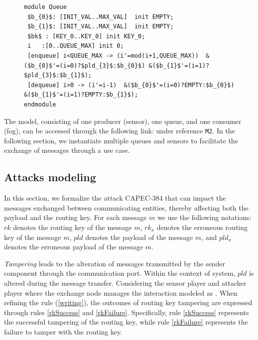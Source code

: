 \begin{figure}[!htb]            
\begin{minipage}{16cm}
\begin{lstlisting}[style=framed,%customc,
	caption=PRISM Code for the Queue Player,
 	label=queueemodel]	
module Queue
 $b_{0}$: [INIT_VAL..MAX_VAL]  init EMPTY;
 $b_{1}$: [INIT_VAL..MAX_VAL]  init EMPTY;
 $bk$ : [KEY_0..KEY_0] init KEY_0;
 i   :[0..QUEUE_MAX] init 0;
 [enqueue] i<QUEUE_MAX -> (i'=mod(i+1,QUEUE_MAX))  &($b_{0}$'=(i=0)?$pld_{3}$:$b_{0}$) &($b_{1}$'=(i=1)?$pld_{3}$:$b_{1}$);
 [dequeue] i>0 -> (i'=i-1)  &($b_{0}$'=(i=0)?EMPTY:$b_{0}$)  &($b_{1}$'=(i=1)?EMPTY:$b_{1}$); 
endmodule
\end{lstlisting}
 \end{minipage}  
\end{figure}

The model, consisting of one producer (sensor), one queue, and one consumer (fog), can be accessed through the following link: \cite{edcc23} under reference \texttt{M2}. In the following section, we instantiate multiple queues and sensors to facilitate the exchange of messages through a use case.



\subsection{Attacks modeling}
\label{sec:threats:manif}

In this section, we formalize the attack CAPEC-384 \cite{capec384} that can impact the messages exchanged between communicating entities, thereby affecting both the payload and the routing key. For each message $m$ we use the following notations:  $rk$ denotes the routing key of the message $m$, $rk_{x}$ denotes the erroneous routing key of the message $m$, $pld$ denotes the payload of the message $m$, and $pld_{x}$ denotes the erroneous payload of the message $m$.

\emph{Tampering} \cite{shostack2014threat}  leads to the alteration of messages transmitted by the sender component through the communication port. Within the context of  system, ${pld}$ is altered during the message transfer. Considering the sensor player  and attacker player  where the exchange node manages the interaction modeled as . When refining the rule (\ref{writing}), the outcomes of routing key tampering are expressed through rules \ref{rkSuccess} and \ref{rkFailure}. Specifically, rule \ref{rkSuccess} represents the successful tampering of the routing key, while rule \ref{rkFailure} represents the failure to tamper with the routing key.

